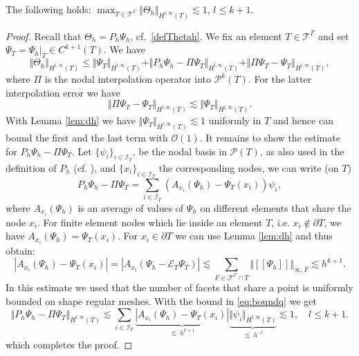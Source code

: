 \documentclass[final]{siamltex}
\begin{document}
\begin{lemma}\label{lemregu}
  The following holds: $\max_{T\in{{\mathcal{T}}^{\Gamma}}} \Vert \Theta_h \Vert_{H^{l,\infty}(T)} \lesssim 1$, $l \leq k+1.$
\end{lemma}
\begin{proof}
Recall that $\Theta_h = P_h \Psi_h$, cf.~\eqref{defThetah}. We fix an element $T \in {{\mathcal{T}}^{\Gamma}}$ and set $\Psi_T = \Psi_h|_T \in C^{k+1}(T)$.
We have 
\[
\Vert \Theta_h \Vert_{H^{l,\infty}(T)} \leq \Vert \Psi_T \Vert_{H^{l,\infty}(T)} + \Vert P_h \Psi_h - \Pi \Psi_T\Vert_{H^{l,\infty}(T)} + \Vert \Pi \Psi_T - \Psi_T\Vert_{H^{l,\infty}(T)},
\]
where $\Pi$ is the nodal interpolation operator into ${\mathcal{P}}^k(T)$. 
For the latter interpolation error we have
\[
\Vert \Pi \Psi_T - \Psi_T \Vert_{H^{l,\infty}(T)} \lesssim \Vert \Psi_T \Vert_{H^{l,\infty}(T)}.
\]
With Lemma \ref{lem:dh} we have
$
\Vert \Psi_T \Vert_{H^{l,\infty}(T)} \lesssim 1
$ 
uniformly in $T$ and hence can bound the first and the last term with $\mathcal{O}(1)$.
It remains to show the estimate for $P_h \Psi_h - \Pi \Psi_T$. Let $\{\psi_i\}_{i\in {\mathcal{I}}_T}$, be the nodal basis in ${\mathcal{P}}(T)$, as also used in the definition of $P_h$ (cf. \cite[Section 2.2]{CLARH1}), and $\{x_i\}_{i\in {\mathcal{I}}_T}$ the corresponding nodes, we can write (on $T$) 
\[
P_h \Psi_h - \Pi \Psi_T = \sum_{i\in {\mathcal{I}}_T} (A_{x_i}(\Psi_h) - \Psi_T(x_i)) \psi_i,
\]
where $A_{x_i}(\Psi_h)$ is an average of values of $\Psi_h$ on different elements that share the node $x_i$. For finite element nodes which lie inside an element $T$, i.e. $x_i \not\in \partial T$, we have
$A_{x_i}(\Psi_h) = \Psi_T(x_i)$. For $x_i \in\partial T$ we can use Lemma \ref{lem:dh} and thus obtain: 
\begin{equation} \label{eq:boundq}
|A_{x_i}(\Psi_h) - \Psi_T(x_i)| = |A_{x_i}(\Psi_h - \mathcal{E}_T\Psi_T)| \lesssim \sum_{F \in {\mathcal{F}}^{\Gamma}\cap T} \Vert {[\![{\Psi_h}]\!]} \Vert_{\infty,F} \lesssim h^{k+1}.
\end{equation}
In this estimate we used that the number of facets that share a point is uniformly bounded on shape regular meshes. 
With the bound in \eqref{eq:boundq} we get 
\[
\Vert P_h \Psi_h - \Pi \Psi_T \Vert_{H^{l,\infty}(T)}
\lesssim \sum_{i\in {\mathcal{I}}_T} \underbrace{|A_{x_i}(\Psi_h) - \Psi_T(x_i)|}_{\lesssim ~ h^{k+1}} \underbrace{\Vert \psi_i \Vert_{H^{l,\infty}(T)}}_{\lesssim ~ h^{-l}} \lesssim 1, \quad l \leq k+1.
\]
which completes the proof.
\end{proof}
\end{document}
